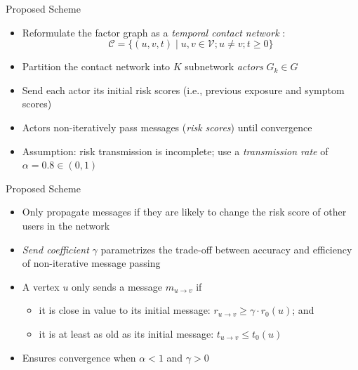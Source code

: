 \documentclass[13pt,aspectratio=169]{beamer}
\newcommand{\trate}{\alpha}
\newcommand{\scoeff}{\gamma}
\newcommand{\vsym}{r}
\newcommand{\tsym}{t}
\newcommand{\msym}{m}
\newcommand{\graph}{G}
\newcommand{\ival}{\vsym_0}
\newcommand{\itime}{\tsym_0}
\newcommand{\msg}[2]{\msym_{#1 \rightarrow #2}}
\newcommand{\mval}[2]{\vsym_{#1 \rightarrow #2}}
\newcommand{\mtime}[2]{\tsym_{#1 \rightarrow #2}}
\newcommand{\contacts}{\mathcal{C}}
\newcommand{\variables}{\mathcal{V}}
\begin{document}
\begin{frame}{Proposed Scheme}
\begin{itemize}
	\item Reformulate the factor graph as a \emph{temporal contact network} \cite{Holme2012, Holme2015}:
		\begin{equation*}
				\contacts = \{(u, v, t) \mid u, v \in \variables; u \neq v; \tsym \geq 0\}
		\end{equation*}
	\item Partition the contact network into $K$ subnetwork \emph{actors} $\graph_k \in \graph$ \cite{Agha1986, Baker1977}
	\item Send each actor its initial risk scores (i.e., previous exposure and symptom scores)
	\item Actors non-iteratively pass messages (\emph{risk scores}) until convergence
	\item Assumption: risk transmission is incomplete; use a \emph{transmission rate} of $\trate = 0.8 \in (0, 1)$ \cite{Hamner2020}
\end{itemize}
\end{frame}

\begin{frame}{Proposed Scheme}
\begin{itemize}
\item Only propagate messages if they are likely to change the risk score of other users in the network
\item \emph{Send coefficient} $\scoeff$ parametrizes the trade-off between accuracy and efficiency of non-iterative message passing
\item A vertex $u$ only sends a message $\msg{u}{v}$ if
	\begin{itemize}
	\item it is close in value to its initial message: $\mval{u}{v} \geq \scoeff \cdot \ival(u)$; and
	\item it is at least as old as its initial message: $\mtime{u}{v} \leq \itime(u)$
	\end{itemize}
\item Ensures convergence when $\trate < 1$ and $\scoeff > 0$
\end{itemize}
\end{frame}
\end{document}
